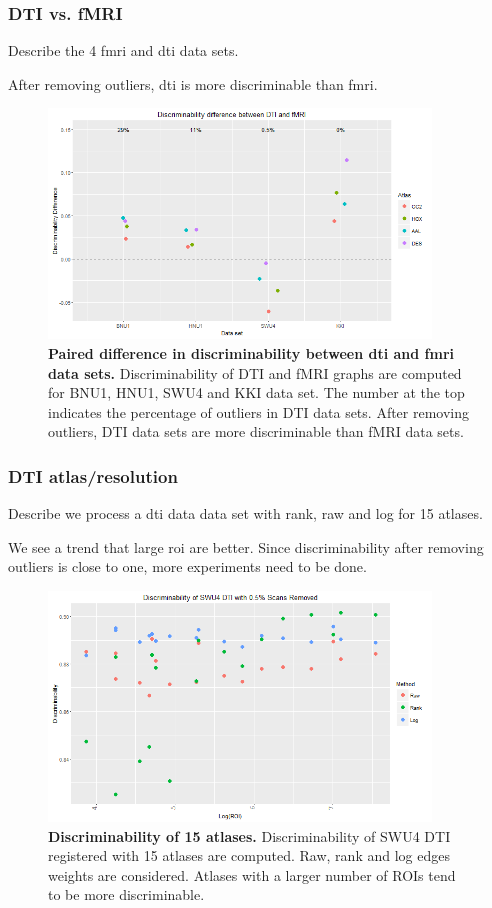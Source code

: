 \documentclass{article}
\begin{document}
\subsubsection{DTI vs. fMRI}
 Describe the 4 fmri and dti data sets.

 After removing outliers, dti is more discriminable than fmri.

\begin{figure}[ht!]
	\includegraphics[width=4.0in]{../Figs/dti_mri_differ.png}
	\caption{{ \bf Paired difference in discriminability between dti and fmri data sets.} Discriminability of DTI and fMRI graphs are computed for BNU1, HNU1, SWU4 and KKI data set. The number at the top indicates the percentage of outliers in DTI data sets. After removing outliers, DTI data sets are more discriminable than fMRI data sets.}
	\label{fig:7}
\end{figure}

\subsubsection{DTI atlas/resolution}
 Describe we process a  dti data data set with rank, raw and log for 15 atlases. 

 We see a trend that large roi are better. Since discriminability after removing outliers is close to one, more experiments need to be done.

\begin{figure}[ht!]
	\includegraphics[width=4.0in]{../Figs/SWU4_DTI_logroi.png}
	\caption{{ \bf Discriminability of 15 atlases.} Discriminability of SWU4 DTI registered with 15 atlases are computed. Raw, rank and log edges weights are considered. Atlases with a larger number of ROIs tend to be more discriminable.}
	\label{fig:7}
\end{figure}
\end{document}
